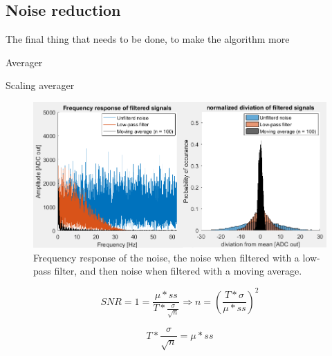 \subsection{Noise reduction}
The final thing that needs to be done, to make the algorithm more 

Averager \cite{Confidence_interval}

Scaling averager \cite{Confidence_interval}

\begin{figure}
	\includegraphics[width=\textwidth]{pics/FiltersVsNoise.png}
	\caption{Frequency response of the noise, the noise when filtered with a low-pass filter, and then noise when filtered with a moving average.}
	\label{fig:FilterVsNoise}
\end{figure}

\begin{equation}
\label{eq:SNR}
SNR = 1 = \frac{\mu * ss}{T * \frac{\sigma}{\sqrt{n}}} \Rightarrow n = \left(\frac{T * \sigma}{\mu*ss}\right)^2
\end{equation}

\begin{equation}
\label{SNR_2}
T * \frac{\sigma}{\sqrt{n}} = \mu * ss
\end{equation}





